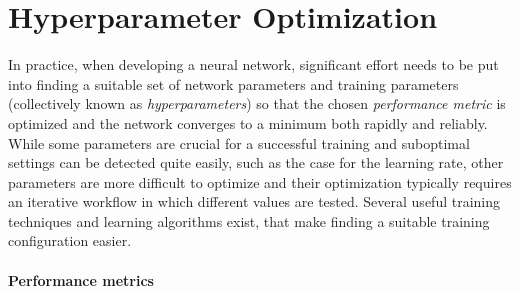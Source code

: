 \section{Hyperparameter Optimization} 
\label{sec:hyperpar-opt}
In practice, when developing a neural network, significant effort needs to be put into finding a suitable set of network parameters and training parameters (collectively known as \emph{hyperparameters}) so that the chosen \emph{performance metric} is optimized and the network converges to a minimum both rapidly and reliably. 
While some parameters are crucial for a successful training and suboptimal settings can be detected quite easily, such as the case for the learning rate, other parameters are more difficult to optimize and their optimization typically requires an iterative workflow in which different values are tested. 
Several useful training techniques and learning algorithms exist, that make finding a suitable training configuration easier.

\paragraph{Performance metrics}

